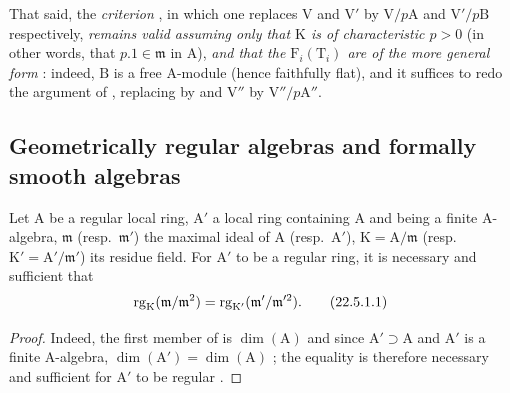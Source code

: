 \begin{remark}[22.4.8]
That said, the \emph{criterion} , in which one replaces $\mathrm{V}$ and $\mathrm{V}'$ by $\mathrm{V}/p\mathrm{A}$ and $\mathrm{V}'/p\mathrm{B}$ respectively, \emph{remains valid assuming only that $\mathrm{K}$ is of characteristic $p>0$} (in other words, that $p.1\in\mathfrak{m}$ in $\mathrm{A}$), \emph{and that the $\mathrm{F}_i(\mathrm{T}_i)$ are of the more general form} : indeed, $\mathrm{B}$ is a free $\mathrm{A}$-module (hence faithfully flat), and it suffices to redo the argument of , replacing  by  and $\mathrm{V}''$ by $\mathrm{V}''/p\mathrm{A}''$.
\end{remark}

\subsection{Geometrically regular algebras and formally smooth algebras}
\label{subsection:0.22.5}

\begin{proposition}[22.5.1]
\label{0.22.5.1}
Let $\mathrm{A}$ be a regular local ring, $\mathrm{A}'$ a local ring containing $\mathrm{A}$ and being a finite $\mathrm{A}$-algebra, $\mathfrak{m}$ (resp.~$\mathfrak{m}'$) the maximal ideal of $\mathrm{A}$ (resp.~$\mathrm{A}'$), $\mathrm{K}=\mathrm{A}/\mathfrak{m}$ (resp.~$\mathrm{K}'=\mathrm{A}'/\mathfrak{m}'$) its residue field.
For $\mathrm{A}'$ to be a regular ring, it is necessary and sufficient that
\[
\label{0.22.5.1.1}
  \operatorname{rg}_\mathrm{K}(\mathfrak{m}/\mathfrak{m}^2)=\operatorname{rg}_{\mathrm{K}'}(\mathfrak{m}'/\mathfrak{m}'^2).
  \tag{22.5.1.1}
\]
\end{proposition}

\begin{proof}
Indeed, the first member of  is $\dim(\mathrm{A})$  and since $\mathrm{A}'\supset\mathrm{A}$ and $\mathrm{A}'$ is a finite $\mathrm{A}$-algebra, $\dim(\mathrm{A}')=\dim(\mathrm{A})$ ; the equality  is therefore necessary and sufficient for $\mathrm{A}'$ to be regular .
\end{proof}


